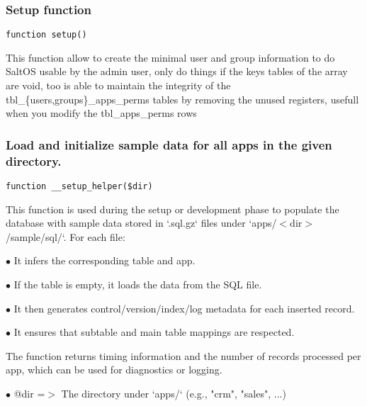 \documentclass[a4paper]{article}
\begin{document}
\hypertarget{toc530}{}
\subsubsection{Setup function}

\begin{lstlisting}
function setup()
\end{lstlisting}

This function allow to create the minimal user and group information to do SaltOS
usable by the admin user, only do things if the keys tables of the array are void,
too is able to maintain the integrity of the tbl\_\{users,groups\}\_apps\_perms tables
by removing the unused registers, usefull when you modify the tbl\_apps\_perms rows

\hypertarget{toc531}{}
\subsubsection{Load and initialize sample data for all apps in the given directory.}

\begin{lstlisting}
function __setup_helper($dir)
\end{lstlisting}

This function is used during the setup or development phase to populate
the database with sample data stored in `.sql.gz` files under
`apps/$<$dir$>$/sample/sql/`. For each file:

\begin{compactitem}
\item[\color{myblue}$\bullet$] It infers the corresponding table and app.
\item[\color{myblue}$\bullet$] If the table is empty, it loads the data from the SQL file.
\item[\color{myblue}$\bullet$] It then generates control/version/index/log metadata for each inserted record.
\item[\color{myblue}$\bullet$] It ensures that subtable and main table mappings are respected.
\end{compactitem}

The function returns timing information and the number of records processed
per app, which can be used for diagnostics or logging.

\begin{compactitem}
\item[\color{myblue}$\bullet$] @dir =$>$ The directory under `apps/` (e.g., "crm", "sales", ...)
\end{compactitem}
\end{document}

